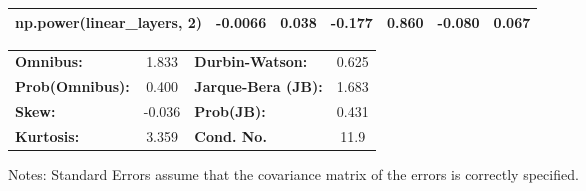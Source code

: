 \begin{center}
\begin{tabular}{lcccccc}
\textbf{np.power(linear\_layers, 2)}      &      -0.0066  &        0.038     &    -0.177  &         0.860        &       -0.080    &        0.067     \\
\bottomrule
\end{tabular}
\begin{tabular}{lclc}
\textbf{Omnibus:}       &  1.833 & \textbf{  Durbin-Watson:     } &    0.625  \\
\textbf{Prob(Omnibus):} &  0.400 & \textbf{  Jarque-Bera (JB):  } &    1.683  \\
\textbf{Skew:}          & -0.036 & \textbf{  Prob(JB):          } &    0.431  \\
\textbf{Kurtosis:}      &  3.359 & \textbf{  Cond. No.          } &     11.9  \\
\bottomrule
\end{tabular}
\end{center}

Notes: \newline
 [1] Standard Errors assume that the covariance matrix of the errors is correctly specified.